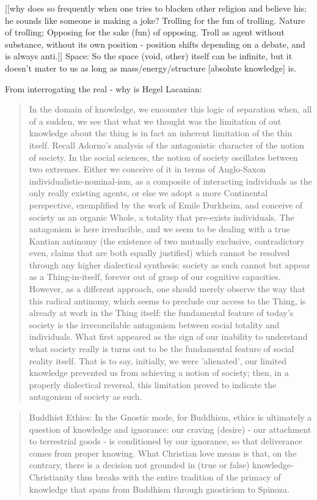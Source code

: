 \documentclass[10pt]{book}
\begin{document}
[[why does so frequently when one tries to blacken other religion and believe his; he sounds like someone is making a joke? Trolling for the fun of trolling. Nature of trolling; Opposing for the sake (fun) of opposing. Troll as agent without substance, without its own position - position shifts depending on a debate, and is always anti.]]
Space:
So the space (void, other) itself can be infinite, but it doesn't mater to us as long as mass/energy/structure [absolute knowledge] is. 



From interrogating the real - why is Hegel Lacanian:
\begin{quotation}
In the domain of knowledge, we encounter this logic of separation when, all of a sudden, we see that what we thought was the limitation of out knowledge about the thing is in fact an inherent limitation of the thin itself. Recall Adorno's analysis of the antagonistic character of the notion of society. In the social sciences, the notion of society oscillates between two extremes. Either we conceive of it in terms of Anglo-Saxon individualistic-nominal-ism, as a composite of interacting individuals as the only really existing agents, or else we adopt a more Continental perspective, exemplified by the work of Emile Durkheim, and conceive of society as an organic Whole, a totality that pre-exists individuals. The antagonism is here irreducible, and we seem to be dealing with a true Kantian antinomy (the existence of two mutually exclusive, contradictory even, claims that are both equally justified) which cannot be resolved through any higher dialectical synthesis: society as such cannot but appear as a Thing-in-itself, forever out of grasp of our cognitive capacities. However, as a different approach, one should merely observe the way that this radical antinomy, which seems to preclude our access to the Thing, is already at work in the Thing itself: the fundamental feature of today's society is the irreconcilable antagonism between social totality and individuals. What first appeared as the sign of our inability to understand what society really is turns out to be the fundamental feature of social reality itself. That is to say, initially, we were 'alienated', our limited knowledge prevented us from achieving a notion of society; then, in a properly dialectical reversal, this limitation proved to indicate the antagonism of society as such.
\end{quotation}
\begin{quotation}
Buddhist Ethics: In the Gnostic mode, for Buddhism, ethics is ultimately a question of knowledge and ignorance: our craving (desire) - our attachment to terrestrial goods - is conditioned by our ignorance, so that deliverance comes from proper knowing. What Christian love means is that, on the contrary, there is a decision not grounded in (true or false) knowledge- Christianity thus breaks with the entire tradition of the primacy of knowledge that spans from Buddhism through gnosticism to Spinoza.
\end{quotation}
\end{document}
